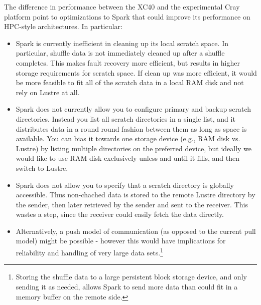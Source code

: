 The difference in performance between the XC40 and the experimental Cray platform point to optimizations to Spark that could improve its performance on HPC-style architectures.  In particular:
\begin{itemize}
\item Spark is currently inefficient in cleaning up its local scratch space.  In particular, shuffle data is not immediately cleaned up after a shuffle completes.  This makes fault recovery more efficient, but results in higher storage requirements for scratch space.  If clean up was more efficient, it would be more feasible to fit all of the scratch data in a local RAM disk and not rely on Lustre at all.
\item Spark does not currently allow you to configure primary and backup scratch directories.  Instead you list all scratch directories in a single list, and it distributes data in a round round fashion between them as long as space is available.  You can bias it towards one storage device (e.g., RAM disk vs. Lustre) by listing multiple directories on the preferred device, but ideally we would like to use RAM disk exclusively unless and until it fills, and then switch to Lustre.
\item Spark does not allow you to specify that a scratch directory is globally accessible.  Thus non-chached data is stored to the remote Lustre directory by the sender, then later retrieved by the sender and sent to the receiver.  This wastes a step, since the receiver could easily fetch the data directly.
\item Alternatively, a push model of communication (as opposed to the current pull model) might be possible - however this would have implications for reliability and handling of very large data sets.\footnote{Storing the shuffle data to a large persistent block storage device, and only sending it as needed, allows Spark to send more data than could fit in a memory buffer on the remote side.}
\end{itemize}
